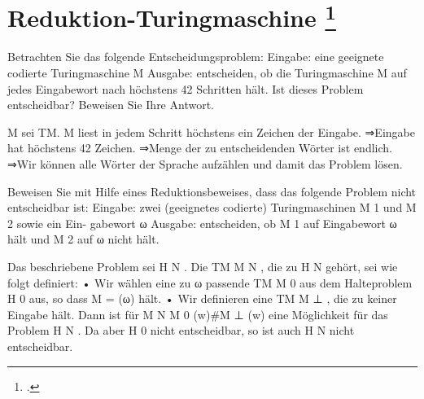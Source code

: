 \documentclass{lehramt-informatik-aufgabe}
\begin{document}
\section{Reduktion-Turingmaschine
\footcite[Aufgabe 10]{theo:ab:4}}

\begin{description}

\item Betrachten Sie das folgende Entscheidungsproblem:
Eingabe: eine geeignete codierte Turingmaschine M
Ausgabe: entscheiden, ob die Turingmaschine M auf jedes Eingabewort nach
höchstens 42 Schritten hält.
Ist dieses Problem entscheidbar? Beweisen Sie Ihre Antwort.

\begin{liAntwort}
M sei TM. M liest in jedem Schritt höchstens ein Zeichen der Eingabe.
⇒Eingabe hat höchstens 42 Zeichen.
⇒Menge der zu entscheidenden Wörter ist endlich.
⇒Wir können alle Wörter der Sprache aufzählen und damit das Problem lösen.
\end{liAntwort}


\item Beweisen Sie mit Hilfe eines Reduktionsbeweises, dass das folgende Problem
nicht entscheidbar ist:
Eingabe: zwei (geeignetes codierte) Turingmaschinen M 1 und M 2 sowie ein Ein-
gabewort ω
Ausgabe: entscheiden, ob M 1 auf Eingabewort ω hält und M 2 auf ω nicht hält.

\begin{liAntwort}
Das beschriebene Problem sei H N .
Die TM M N , die zu H N gehört, sei wie folgt deﬁniert:
• Wir wählen eine zu ω passende TM M 0 aus dem Halteproblem H 0 aus, so dass
M = (ω) hält.
• Wir deﬁnieren eine TM M ⊥ , die zu keiner Eingabe hält.
Dann ist für M N M 0 (w)\#M ⊥ (w) eine Möglichkeit für das Problem H N . Da aber H 0 nicht
entscheidbar, so ist auch H N nicht entscheidbar.
\end{liAntwort}

\end{description}
\end{document}
